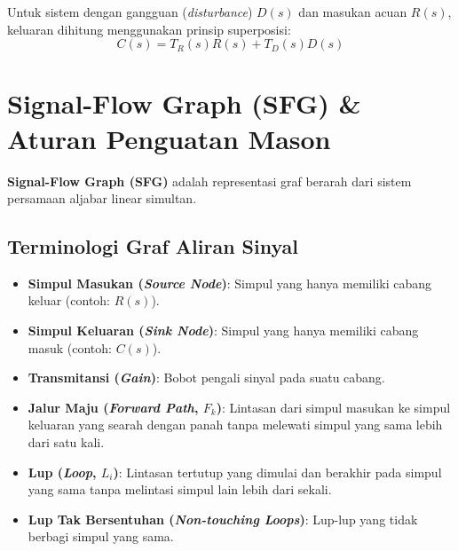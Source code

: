 \documentclass[11pt,a4paper]{article}
\begin{document}
Untuk sistem dengan gangguan (\textit{disturbance}) $D(s)$ dan masukan acuan $R(s)$, keluaran dihitung menggunakan prinsip superposisi:
\begin{equation*}
    C(s) = T_R(s) R(s) + T_D(s) D(s)
\end{equation*}

\vspace{6pt}

\section{Signal-Flow Graph (SFG) \& Aturan Penguatan Mason}

\textbf{Signal-Flow Graph (SFG)} adalah representasi graf berarah dari sistem persamaan aljabar linear simultan.

\subsection{Terminologi Graf Aliran Sinyal}
\begin{itemize}
    \item \textbf{Simpul Masukan (\textit{Source Node})}: Simpul yang hanya memiliki cabang keluar (contoh: $R(s)$).
    \item \textbf{Simpul Keluaran (\textit{Sink Node})}: Simpul yang hanya memiliki cabang masuk (contoh: $C(s)$).
    \item \textbf{Transmitansi (\textit{Gain})}: Bobot pengali sinyal pada suatu cabang.
    \item \textbf{Jalur Maju (\textit{Forward Path}, $F_k$)}: Lintasan dari simpul masukan ke simpul keluaran yang searah dengan panah tanpa melewati simpul yang sama lebih dari satu kali.
    \item \textbf{Lup (\textit{Loop}, $L_i$)}: Lintasan tertutup yang dimulai dan berakhir pada simpul yang sama tanpa melintasi simpul lain lebih dari sekali.
    \item \textbf{Lup Tak Bersentuhan (\textit{Non-touching Loops})}: Lup-lup yang tidak berbagi simpul yang sama.
\end{itemize}
\end{document}
